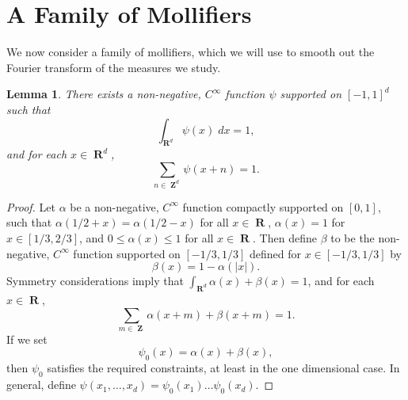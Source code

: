 \documentclass[12pt,reqno]{article}
\numberwithin{equation}{section}
\DeclareMathOperator{\RR}{\mathbf{R}}
\DeclareMathOperator{\ZZ}{\mathbf{Z}}
\newtheorem{lemma}[theorem]{Lemma}
\begin{document}
\section{A Family of Mollifiers}

We now consider a family of mollifiers, which we will use to smooth out the Fourier transform of the measures we study.

\begin{lemma} \label{lemma19020941290}
    There exists a non-negative, $C^\infty$ function $\psi$ supported on $[-1,1]^d$ such that
    \begin{equation} \label{equation1249015901590190}
        \int_{\RR^d} \psi(x)\; dx = 1,
    \end{equation}
    and for each $x \in \RR^d$,
    \begin{equation} \label{equation50914902149012}
        \sum_{n \in \ZZ^d} \psi(x + n) = 1.
    \end{equation}
\end{lemma}
\begin{proof}
    Let $\alpha$ be a non-negative, $C^\infty$ function compactly supported on $[0,1]$, such that $\alpha(1/2 + x) = \alpha(1/2 - x)$ for all $x \in \RR$, $\alpha(x) = 1$ for $x \in [1/3,2/3]$, and $0 \leq \alpha(x) \leq 1$ for all $x \in \RR$. Then define $\beta$ to be the non-negative, $C^\infty$ function supported on $[-1/3,1/3]$ defined for $x \in [-1/3,1/3]$ by
    \[ \beta(x) = 1 - \alpha(|x|). \]
    Symmetry considerations imply that $\int_{\RR^d} \alpha(x) + \beta(x) = 1$, and for each $x \in \RR$,
    \begin{equation} \label{equation129410294910}
        \sum_{m \in \ZZ} \alpha(x + m) + \beta(x + m) = 1.
    \end{equation}
    If we set
    \[ \psi_0(x) = \alpha(x) + \beta(x), \]
    then $\psi_0$ satisfies the required constraints, at least in the one dimensional case. In general, define $\psi(x_1, \dots, x_d) = \psi_0(x_1) \dots \psi_0(x_d)$.
\end{proof}
\end{document}
